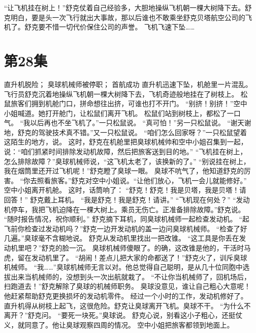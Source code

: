 \documentclass[a4paper,12pt,UTF8,twoside]{ctexbook}
\begin{document}
        “让飞机挂在树上！”舒克仗着自己经验多，大胆地操纵飞机朝一棵大树降下去。舒克明白，要是头一次飞行就出大事故，那以后谁也不敢乘坐舒克贝塔航空公司的飞机了。舒克要不惜一切代价保住公司的声誉。 
        飞机飞速下坠……   \chapter{第28集} 
        直升机脱险； 
        臭球机械师被停职； 
        首航成功   
        直升机迅速下坠，机舱里一片混乱。 
        飞行员舒克沉着地操纵飞机朝一棵大树降下去，飞机奇迹般地挂在了树枝上。 
        松鼠旅客们拥到机舱门口，拼命想往出挤，可谁也打不开门。 
        “别挤！别挤！”空中小姐喊道。她打开舱门，让松鼠们离开飞机。 
        松鼠们站到树枝上，都松了一口气。 
        “我以后再也不坐飞机了。”一只松鼠说。 
        “真可怕！”另一只松鼠说。 
        “谢天谢地，舒克的驾驶技术真不错。”又一只松鼠说。 
        “咱们怎么回家呀？”一只松鼠望着这陌生的地方，说。 
        这时，舒克在机舱里把臭球机械帅和空中小姐召集到一起，说：“咱们抓紧时间排除发动机故障，然后把旅客送到目的地。” 
        “飞机挂在树上，怎么排除故障？”臭球机械师说，“这飞机太老了，该换新的了。” 
        “别说挂在树上，我在烟筒里还开过飞机呢！”舒克瞪了臭球一眼。 
        臭球不吭气了，他知道舒克的厉害。 
        “你去照看旅客。”舒克对空中小姐说。“让他们放心，飞机一会儿就能修好。” 
        空中小姐离开机舱。 
        这时，话筒响了： 
        “舒克！舒克！我是贝塔，我是贝塔！请回答！” 
        舒克戴上耳机。 
        “我是舒克！我是舒克！请讲。” 
        “飞机现在何处？” 
        “发动机停车，我把飞机迫降在一棵大树上。乘员无伤亡。正准备排除故障。”舒克说。 
        “随时报告情况，祝你顺利。” 
        舒克摘下耳机，同臭球机械师一起检查发动机。 
        “起飞前你检查过发动机吗？”舒克一边开发动机的盖一边问臭球机械师。 
        “检查了好几遍。”臭球毫不含糊地说。 
        舒克从发动机里找出一把改锥。 
        “这工具是你丢在发动机里吧？”舒克的脸一沉。 
        臭球机械师傻眼了。的确，这改锥是他的，干活时马虎，留在发动机里了。 
        “胡闹！差点儿把大家的命都送了！”舒克火了，训斥臭球机械师。 
        “我……”臭球机械师无言以对。他总觉得自己聪明，是从几十位同胞中选拔出来当机械师的，没想到头一次出航就栽了。 
        “不让你当机械师了，回机场后，扫跑道去！”舒克解除了臭球的机械师职务。 
        臭球没意见，谁让自己粗心大意呢！他赶紧帮助舒克更换损坏的发动机零件。 
        经过一个小时的工作，发动机修好了。 
        直升机得从树枝上起飞，这很危险。舒克让臭球离开飞机。臭球不干。 
        “为什么不离开？”舒克问。 
        “要死一块死。”臭球说。 
        舒克心说，别看这小子粗心，还挺仗义，就同意了。他让臭球观察四周的情况。 
        空中小姐把旅客都领到地面上。 
\end{document}

